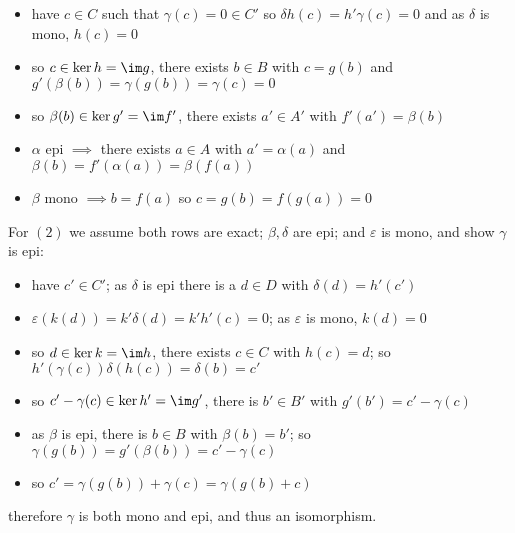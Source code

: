 \documentclass[a4paper]{article}
\begin{document}
\begin{theorem}
\begin{prf}
\begin{itemize}
        \item have $c\in C$ such that $\gamma(c)=0\in C'$ so $\delta h(c) = h'\gamma(c) = 0$ and as $\delta$ is mono, $h(c)=0$
        \item so $c\in \ker h = \im g$, there exists $b\in B$ with $c=g(b)$ and $g'(\beta(b)) = \gamma(g(b)) = \gamma(c) = 0$
        \item so $\beta(b)\in\ker g'=\im f'$, there exists $a'\in A'$ with $f'(a') = \beta(b)$
        \item $\alpha$ epi $\implies$ there exists $a\in A$ with $a' = \alpha(a)$ and $\beta(b) = f'(\alpha(a)) = \beta(f(a))$
        \item $\beta$ mono $\implies b=f(a)$ so $c=g(b) = f(g(a)) = 0$
    \end{itemize} 
    For $(2)$ we assume both rows are exact; $\beta,\delta$ are epi; and $\varepsilon$ is mono, and show $\gamma$ is epi:
    \begin{itemize}
        \item have $c'\in C'$; as $\delta$ is epi there is a $d\in D$ with $\delta(d)=h'(c')$
        \item $\varepsilon (k(d)) = k'\delta(d) = k'h'(c) = 0$; as $\varepsilon$ is mono, $k(d) = 0$
        \item so $d\in\ker k = \im h$, there exists $c\in C$ with  $h(c) = d$; so $h'(\gamma(c))\delta(h(c)) = \delta(b) = c'$
        \item so $c'-\gamma(c)\in\ker h' = \im g'$, there is $b'\in B'$ with $g'(b')=c'-\gamma(c)$
        \item as $\beta$ is epi, there is $b\in B$ with $\beta(b) = b'$; so $\gamma(g(b)) = g'(\beta(b)) = c'-\gamma(c)$
        \item so $c'=\gamma(g(b))+\gamma(c) = \gamma(g(b) + c)$
    \end{itemize} 
    therefore $\gamma$ is both mono and epi, and thus an isomorphism.
    \end{prf}
\end{theorem}


\end{document}
